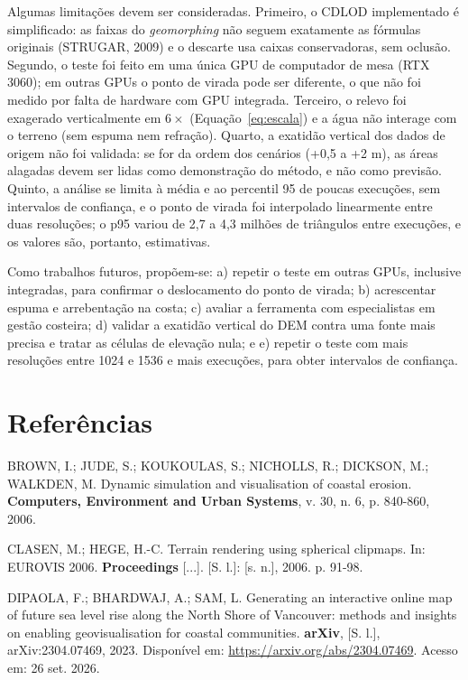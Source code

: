 \documentclass[conference]{IEEEtran}
\begin{document}
Algumas limitações devem ser consideradas. Primeiro, o CDLOD implementado é simplificado: as faixas do \emph{geomorphing} não seguem exatamente as fórmulas originais (STRUGAR, 2009) e o descarte usa caixas conservadoras, sem oclusão. Segundo, o teste foi feito em uma única GPU de computador de mesa (RTX 3060); em outras GPUs o ponto de virada pode ser diferente, o que não foi medido por falta de hardware com GPU integrada. Terceiro, o relevo foi exagerado verticalmente em $6\times$ (Equação~\eqref{eq:escala}) e a água não interage com o terreno (sem espuma nem refração). Quarto, a exatidão vertical dos dados de origem não foi validada: se for da ordem dos cenários (+0,5 a +2 m), as áreas alagadas devem ser lidas como demonstração do método, e não como previsão. Quinto, a análise se limita à média e ao percentil 95 de poucas execuções, sem intervalos de confiança, e o ponto de virada foi interpolado linearmente entre duas resoluções; o p95 variou de 2,7 a 4,3 milhões de triângulos entre execuções, e os valores são, portanto, estimativas.

Como trabalhos futuros, propõem-se: a) repetir o teste em outras GPUs, inclusive integradas, para confirmar o deslocamento do ponto de virada; b) acrescentar espuma e arrebentação na costa; c) avaliar a ferramenta com especialistas em gestão costeira; d) validar a exatidão vertical do DEM contra uma fonte mais precisa e tratar as células de elevação nula; e e) repetir o teste com mais resoluções entre 1024 e 1536 e mais execuções, para obter intervalos de confiança.

\section*{Referências}
\begingroup
\footnotesize
\raggedright
\setlength{\parindent}{0pt}
\setlength{\parskip}{4pt}

BROWN, I.; JUDE, S.; KOUKOULAS, S.; NICHOLLS, R.; DICKSON, M.; WALKDEN,
M. Dynamic simulation and visualisation of coastal erosion. \textbf{Computers,
Environment and Urban Systems}, v. 30, n. 6, p. 840-860, 2006.

CLASEN, M.; HEGE, H.-C. Terrain rendering using spherical clipmaps. In:
EUROVIS 2006. \textbf{Proceedings} [...]. [S. l.]: [s. n.], 2006. p. 91-98.

DIPAOLA, F.; BHARDWAJ, A.; SAM, L. Generating an interactive online map of
future sea level rise along the North Shore of Vancouver: methods and
insights on enabling geovisualisation for coastal communities. \textbf{arXiv},
[S. l.], arXiv:2304.07469, 2023. Disponível em:
\url{https://arxiv.org/abs/2304.07469}. Acesso em: 26 set. 2026.
\end{document}
